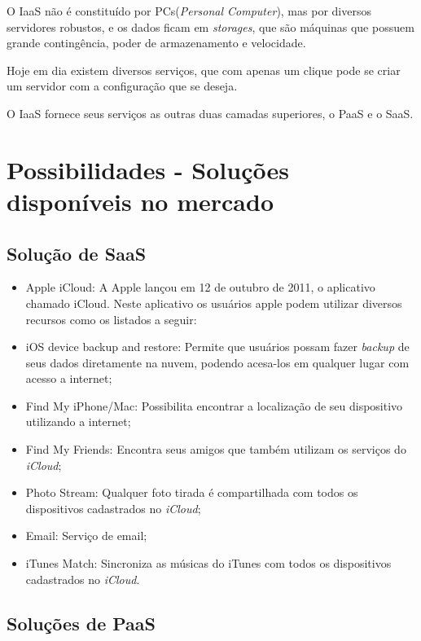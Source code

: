 \documentclass{abnt}
\begin{document}
		O IaaS não é constituído por PCs(\textit{Personal Computer}), mas por diversos servidores robustos, e os dados ficam em \textit{storages}, que são máquinas que possuem grande contingência, poder de armazenamento e velocidade.
		
		Hoje em dia existem diversos serviços, que com apenas um clique pode se criar um servidor com a configuração que se deseja.
		
		O IaaS fornece seus serviços as outras duas camadas superiores, o PaaS e o SaaS.
		 
	\chapter{Possibilidades - Soluções disponíveis no mercado}

	\section{Solução de SaaS}

	\begin{itemize}
		\item[] Apple iCloud: A Apple lançou em 12 de outubro de 2011, o aplicativo chamado iCloud. Neste aplicativo os usuários apple podem 
	utilizar diversos recursos como os listados a seguir:
	\end{itemize}

	\begin{itemize}
	  \item iOS device backup and restore: Permite que usuários possam fazer \textit{backup} de seus dados diretamente na nuvem,
	  podendo acesa-los em qualquer lugar com acesso a internet;
	  \item Find My iPhone/Mac: Possibilita encontrar a localização de seu dispositivo utilizando a internet;
	  \item Find My Friends: Encontra seus amigos que também utilizam os serviços do \textit{iCloud};
	  \item Photo Stream: Qualquer foto tirada é compartilhada com todos os dispositivos cadastrados no \textit{iCloud};
	  \item Email: Serviço de email;
	  \item iTunes Match: Sincroniza as músicas do iTunes com todos os dispositivos cadastrados no \textit{iCloud}.
	\end{itemize}
	
	\section{Soluções de PaaS}
\end{document}
